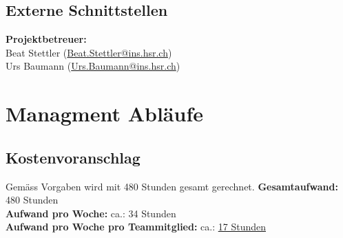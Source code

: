 
\subsection{Externe Schnittstellen}
\textbf{Projektbetreuer:} \\
Beat Stettler (\href{mailto:Beat.Stettler@ins.hsr.ch}{Beat.Stettler@ins.hsr.ch})  
\\
Urs Baumann (\href{mailto:Urs.Baumann@ins.hsr.ch}{Urs.Baumann@ins.hsr.ch})


\section{Managment Abläufe}

\subsection{Kostenvoranschlag}
Gemäss Vorgaben wird mit 480 Stunden gesamt gerechnet.
\newline
\textbf{Gesamtaufwand:} 480 Stunden\\
\textbf{Aufwand pro Woche:} ca.:  34 Stunden\\
\textbf{Aufwand pro Woche pro Teammitglied:} ca.: \uline{17 Stunden}

